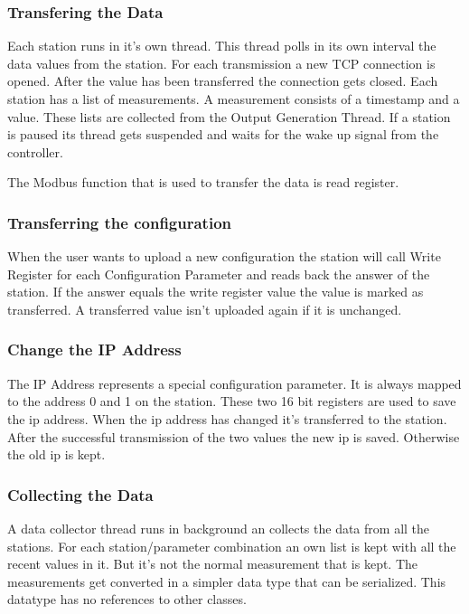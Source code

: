 \subsubsection{Transfering the Data} %
\label{ssub:getting_the_data}
Each station runs in it's own thread. This thread polls in its own interval the data values from the station. For each transmission a new TCP connection is opened. After the value has been transferred the connection gets closed. Each station has a list of measurements. A measurement consists of a timestamp and a value. These lists are collected from the Output Generation Thread. If a station is paused its thread gets suspended and waits for the wake up signal from the controller. 

The Modbus function that is used to transfer the data is read register.

\subsubsection{Transferring the configuration} %
\label{ssub:transferring_the_configuration}
When the user wants to upload a new configuration the station will call Write Register for each Configuration Parameter and reads back the answer of the station. If the answer equals the write register value the value is marked as transferred. A transferred value isn't uploaded again if it is unchanged.
\subsubsection{Change the IP Address} %
\label{ssub:change_the_ip_address}
The IP Address represents a special configuration parameter. It is always mapped to the address 0 and 1 on the station. These two 16 bit registers are used to save the ip address. When the ip address has changed it's transferred to the station. After the successful transmission of the two values the new ip is saved. Otherwise the old ip is kept.


\subsubsection{Collecting the Data} %
\label{ssub:collecting_the_data}
A data collector thread runs in background an collects the data from all the stations. For each station/parameter combination an own list is kept with all the recent values in it. But it's not the normal measurement that is kept. The measurements get converted in a simpler data type that can be serialized. This datatype has no references to other classes. 

